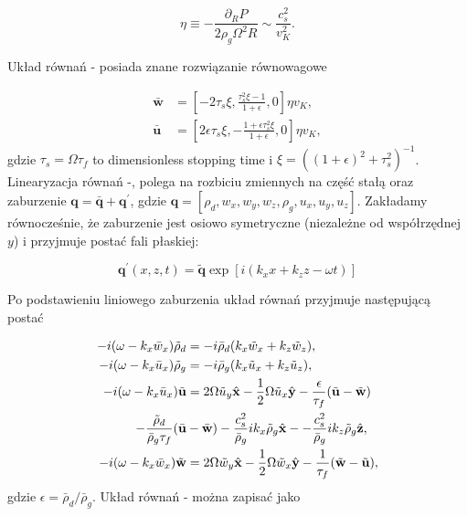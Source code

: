 \begin{equation}
\eta \equiv - \frac{\partial_R P}{2\rho_g\Omega^2 R} \sim \frac{c_s^2}{v_K^2}.
\end{equation}

Układ równań - posiada znane rozwiązanie równowagowe~\citep{N86}

\begin{align}
\bar{\mathbf{w}} &= \left[ 
 -2\tau_s\xi, \frac{\tau_s^2\xi - 1}{1+\epsilon},
 0
\right]\eta v_K, \label{eq:w0}\\
\bar{\mathbf{u}} &= \left[ 
 2\epsilon\tau_s\xi, -\frac{1 + \epsilon\tau_s^2\xi}{1+\epsilon},
 0
\right]\eta v_K, \label{eq:u0}
\end{align}
%
gdzie $\tau_s = \Omega \tau_f$ to dimensionless stopping time i 
$\xi = ((1+\epsilon)^2 + \tau_s^2)^{-1}$. 
Linearyzacja równań -, polega na rozbiciu zmiennych na
część stałą oraz zaburzenie $\mathbf{q} = \bar{\mathbf{q}} + \mathbf{q}^\prime$,
gdzie $\mathbf{q}=[\rho_d, w_x, w_y, w_z, \rho_g, u_x, u_y, u_z]$. Zakładamy
równocześnie, że zaburzenie jest osiowo symetryczne (niezależne od współrzędnej $y$)
i przyjmuje postać fali płaskiej:

\begin{equation}
   \label{eq:planar}
   \mathbf{q}^\prime(x,z,t) = \tilde{\mathbf{q}}
 \exp\left[i(k_x x + k_z z -\omega t)\right]
\end{equation}

Po podstawieniu liniowego zaburzenia układ równań przyjmuje następującą postać

\begin{align}
-i(\omega- k_x\bar{w}_x)\tilde{\rho}_d &= 
 - i \bar{\rho}_d(k_x\tilde{w}_x + k_z\tilde{w}_z), \label{lin1}\\
-i(\omega- k_x\bar{u}_x)\tilde{\rho}_g &= 
 - i \bar{\rho}_g(k_x\tilde{u}_x + k_z\tilde{u}_z), \label{lin2}\\
-i(\omega- k_x\bar{u}_x)\tilde{\mathbf{u}} &= 
 2\Omega \tilde{u}_y\hat{\mathbf{x}} - \frac{1}{2}\Omega \tilde{u}_x
 \hat{\mathbf{y}}
 -\frac{\epsilon}{\tau_f}(\tilde{\mathbf{u}} - \tilde{\mathbf{w}}) \notag\\
  -\frac{\tilde{\rho}_d}{\bar{\rho}_g\tau_f}
  (\bar{\mathbf{u}} &- \bar{\mathbf{w}})
  - \frac{c_s^2}{\bar{\rho}_g}ik_x\tilde{\rho}_g\hat{\mathbf{x}} -
  - \frac{c_s^2}{\bar{\rho}_g}ik_z\tilde{\rho}_g\hat{\mathbf{z}}, \label{lin3}\\
-i(\omega- k_x\bar{w}_x)\tilde{\mathbf{w}} &= 
 2\Omega \tilde{w}_y\hat{\mathbf{x}} - \frac{1}{2}\Omega \tilde{w}_x
 \hat{\mathbf{y}} 
 - \frac{1}{\tau_f} (\tilde{\mathbf{w}} - \tilde{\mathbf{u}}), \label{lin4}
\end{align}
%
gdzie $\epsilon = \bar{\rho}_d/\bar{\rho}_g$. Układ równań
- można zapisać jako

